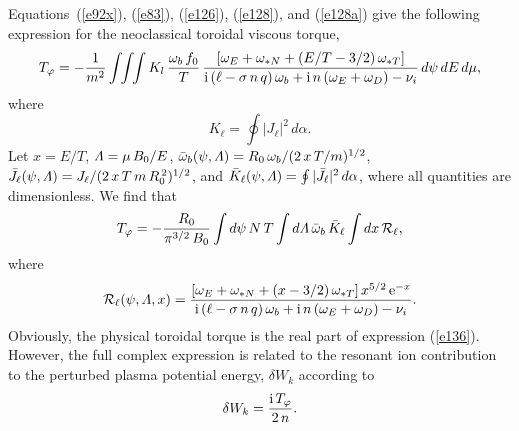 \documentclass[12pt,prb,aps,notitlepage]{revtex4-1}
\begin{document}
Equations~(\ref{e92x}), (\ref{e83}), (\ref{e126}), (\ref{e128}), and (\ref{e128a}) give the following expression for the neoclassical toroidal viscous torque,
\begin{equation}
T_\varphi =- \frac{1}{m^2}\int\!\!\int\!\!\int K_l\,\frac{\omega_b\,f_0}{T}\,\frac{[\omega_E + \omega_{\ast N}+(E/T-3/2)\,\omega_{\ast T}]}{
{\rm i}\,(\ell - \sigma\,n\,q)\,\omega_b +{\rm i}\,n\,(\omega_E+\omega_D)-\nu_i}\,d\psi\,dE\,d\mu,
\end{equation}
where
\begin{equation}
K_\ell = \oint| J_\ell|^2\,d\alpha.
\end{equation}
Let $x=E/T$, ${\mit\Lambda}=\mu\,B_0/E$, $\bar{\omega}_b(\psi,{\mit\Lambda}) = R_0\,\omega_b/(2\,x\,T/m)^{1/2}$, $\bar{J}_\ell(\psi,{\mit\Lambda}) = J_\ell/(2\,x\,T\,m\,R_0^{\,2})^{1/2}$,
and $\bar{K}_\ell(\psi, {\mit\Lambda}) = \oint |\bar{J}_\ell|^2\,d\alpha$, where all quantities are dimensionless. We find that
\begin{equation}\label{e136}
T_\varphi = - \frac{R_0}{\pi^{3/2}\,B_0}\int d\psi\,N\,T\int d{\mit\Lambda}\,\bar{\omega}_b\,\bar{K}_\ell\int dx\,{\cal R}_\ell,
\end{equation}
where
\begin{equation}
{\cal R}_\ell(\psi,{\mit\Lambda},x) =\frac{[\omega_E + \omega_{\ast N}+(x-3/2)\,\omega_{\ast T}]\,x^{5/2}\,{\rm e}^{-x}}{
{\rm i}\,(\ell - \sigma\,n\,q)\,\omega_b +{\rm i}\,n\,(\omega_E+\omega_D)-\nu_i}.
\end{equation}
Obviously, the physical toroidal torque is the real part of expression (\ref{e136}). However, the full complex expression is related to the resonant ion contribution to the
perturbed plasma potential energy, $\delta W_k$ according to
\begin{equation}
\delta W_k = \frac{{\rm i}\,T_\varphi}{2\,n}.
\end{equation}
\end{document}
